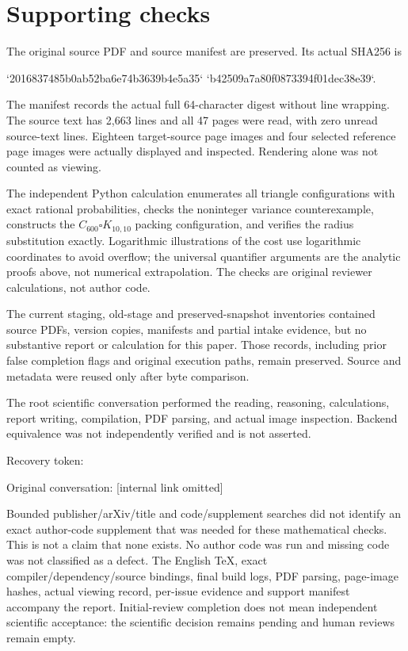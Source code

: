 \documentclass[10pt]{article}
\begin{document}
\section*{Supporting checks}
The original source PDF and source manifest are preserved. Its actual SHA256 is\par
`2016837485b0ab52ba6e74b3639b4e5a35`
`b42509a7a80f0873394f01dec38e39`.\par
The manifest records the actual full 64-character digest without line wrapping. The source text has 2,663 lines and all 47 pages were read, with zero unread source-text lines. Eighteen target-source page images and four selected reference page images were actually displayed and inspected. Rendering alone was not counted as viewing.\par
The independent Python calculation enumerates all triangle configurations with exact rational probabilities, checks the noninteger variance counterexample, constructs the \(C_{600}\square K_{10,10}\) packing configuration, and verifies the radius substitution exactly. Logarithmic illustrations of the cost use logarithmic coordinates to avoid overflow; the universal quantifier arguments are the analytic proofs above, not numerical extrapolation. The checks are original reviewer calculations, not author code.\par
The current staging, old-stage and preserved-snapshot inventories contained source PDFs, version copies, manifests and partial intake evidence, but no substantive report or calculation for this paper. Those records, including prior false completion flags and original execution paths, remain preserved. Source and metadata were reused only after byte comparison.\par
The root scientific conversation performed the reading, reasoning, calculations, report writing, compilation, PDF parsing, and actual image inspection. Backend equivalence was not independently verified and is not asserted.\par
Recovery token:\par
Original conversation: [internal link omitted]\par
Bounded publisher/arXiv/title and code/supplement searches did not identify an exact author-code supplement that was needed for these mathematical checks. This is not a claim that none exists. No author code was run and missing code was not classified as a defect. The English TeX, exact compiler/dependency/source bindings, final build logs, PDF parsing, page-image hashes, actual viewing record, per-issue evidence and support manifest accompany the report. Initial-review completion does not mean independent scientific acceptance: the scientific decision remains pending and human reviews remain empty.\par
\end{document}
